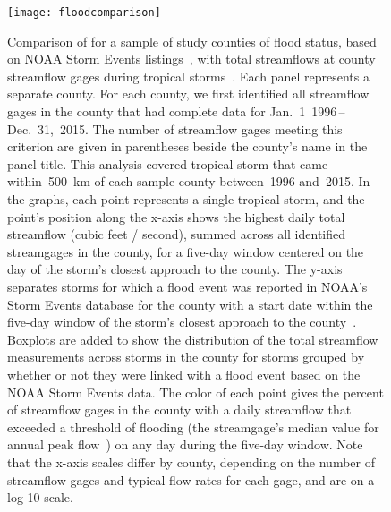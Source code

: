\begin{figure}[tbhp!]
\centering
\texttt{[image: floodcomparison]}
\caption{Comparison of for a sample of study counties of flood status, based on
NOAA Storm Events listings~\citep{stormevents, noaastormevents}, with total
streamflows at county streamflow gages during tropical storms~\citep{usgsgages,
countyfloods, dataRetrieval}. Each panel represents a separate county. For each
county, we first identified all streamflow gages in the county that had
complete data for Jan.~1~1996\,--\,Dec.~31,~2015. The number of streamflow
gages meeting this criterion are given in parentheses beside the county's name
in the panel title. This analysis covered tropical storm that came
within~500~\si{\kilo\metre} of each sample county between~1996 and~2015. In the
graphs, each point represents a single tropical storm, and the point's position
along the x-axis shows the highest daily total streamflow (cubic feet /
second), summed across all identified streamgages in the county, for a five-day
window centered on the day of the storm's closest approach to the county. The
y-axis separates storms for which a flood event was reported in NOAA's Storm
Events database for the county with a start date within the five-day window of
the storm's closest approach to the county~\citep{stormevents,
noaastormevents}. Boxplots are added to show the distribution of the total
streamflow measurements across storms in the county for storms grouped by
whether or not they were linked with a flood event based on the NOAA Storm
Events data. The color of each point gives the percent of streamflow gages in
the county with a daily streamflow that exceeded a threshold of flooding (the
streamgage's median value for annual peak flow~\citep{countyfloods}) on any day
during the five-day window.  Note that the x-axis scales differ by county,
depending on the number of streamflow gages and typical flow rates for each
gage, and are on a log-10 scale.}
\label{fig:floodcomparison}
\end{figure}


